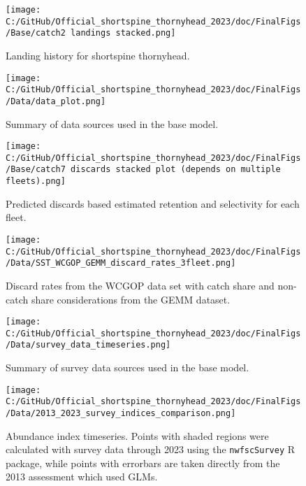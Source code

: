 \documentclass[11pt,
  english,
  letterpaper,
]{article}
\begin{document}
\begin{figure}
\centering
\texttt{[image: C:/GitHub/Official\_shortspine\_thornyhead\_2023/doc/FinalFigs/Base/catch2 landings stacked.png]}
\caption{Landing history for shortspine thornyhead.\label{fig:catch_hist}}
\end{figure}

\begin{figure}
\centering
\texttt{[image: C:/GitHub/Official\_shortspine\_thornyhead\_2023/doc/FinalFigs/Data/data\_plot.png]}
\caption{Summary of data sources used in the base model.\label{fig:assessment_data_timeseries}}
\end{figure}

\begin{figure}
\centering
\texttt{[image: C:/GitHub/Official\_shortspine\_thornyhead\_2023/doc/FinalFigs/Base/catch7 discards stacked plot (depends on multiple fleets).png]}
\caption{Predicted discards based estimated retention and selectivity for each fleet.\label{fig:disc_hist}}
\end{figure}

\begin{figure}
\centering
\texttt{[image: C:/GitHub/Official\_shortspine\_thornyhead\_2023/doc/FinalFigs/Data/SST\_WCGOP\_GEMM\_discard\_rates\_3fleet.png]}
\caption{Discard rates from the WCGOP data set with catch share and non-catch share considerations from the GEMM dataset.\label{fig:disc_rates_WCGOP}}
\end{figure}

\begin{figure}
\centering
\texttt{[image: C:/GitHub/Official\_shortspine\_thornyhead\_2023/doc/FinalFigs/Data/survey\_data\_timeseries.png]}
\caption{Summary of survey data sources used in the base model.\label{fig:survey_data_timeseries}}
\end{figure}

\begin{figure}
\centering
\texttt{[image: C:/GitHub/Official\_shortspine\_thornyhead\_2023/doc/FinalFigs/Data/2013\_2023\_survey\_indices\_comparison.png]}
\caption{Abundance index timeseries. Points with shaded regions were calculated with survey data through 2023 using the \texttt{nwfscSurvey} R package, while points with errorbars are taken directly from the 2013 assessment which used GLMs.\label{fig:designbasedsurv}}
\end{figure}
\end{document}
